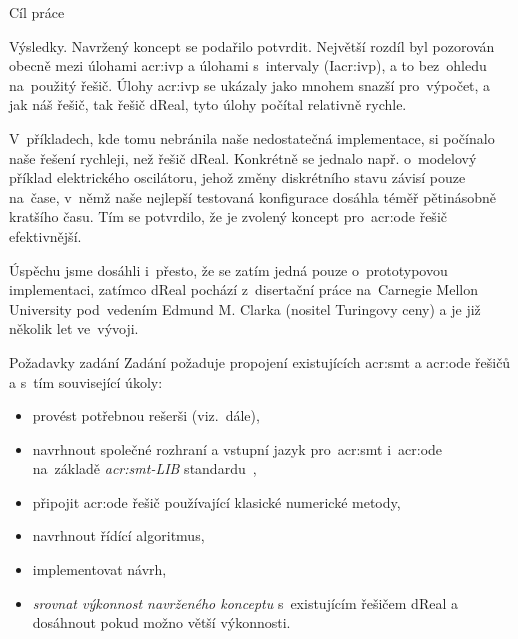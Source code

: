 \documentclass[thesis=M,czech]{FITthesis}[2012/06/26]
\newcommand{\acrlabel}[1]{acr:#1}
\newcommand{\acr}[1]{\acrshort{\acrlabel{#1}}}
\newcommand{\hl}[1]{\textit{#1}}
\newcommand{\name}[1]{\hl{#1}}
\newcommand{\cit}[1]{\cite{#1}}
\begin{document}
\begin{introduction}
\begin{section}{Cíl práce}

\begin{paragraph}{Výsledky.}\label{p:intro:goal:results}
Navržený koncept se podařilo potvrdit.
Největší rozdíl byl pozorován obecně
mezi úlohami \acr{ivp} a úlohami s~intervaly
(I\acr{ivp}), a to bez~ohledu
na~použitý řešič.
Úlohy \acr{ivp} se ukázaly jako mnohem
snazší pro~výpočet,
a jak náš řešič, tak řešič dReal,
tyto úlohy počítal relativně rychle.

V~příkladech, kde tomu nebránila
naše nedostatečná implementace,
si počínalo naše řešení rychleji, než řešič dReal.
Konkrétně se jednalo např. o~modelový příklad
elektrického oscilátoru, jehož změny diskrétního stavu
závisí pouze na~čase,
v~němž naše nejlepší testovaná konfigurace
dosáhla téměř pětinásobně kratšího času.
Tím se potvrdilo,
že je zvolený koncept pro~\acr{ode} řešič efektivnější.

Úspěchu jsme dosáhli i~přesto,
že se zatím jedná pouze o~prototypovou implementaci,
zatímco dReal pochází z~disertační práce
na~Carnegie Mellon University
pod~vedením Edmund M. Clarka (nositel Turingovy ceny)
a je již několik let ve~vývoji.
\end{paragraph} %


\end{section} %


\begin{section}{Požadavky zadání}\label{s:intro:req}
Zadání požaduje propojení existujících \acr{smt} a \acr{ode} řešičů
a s~tím související úkoly:
\begin{itemize}
\item provést potřebnou rešerši (viz.~dále),
\item navrhnout společné rozhraní
   a vstupní jazyk pro~\acr{smt} i~\acr{ode}
   na~základě \name{\acr{smt}-LIB} standardu~\cit{smtlib},
\item připojit \acr{ode} řešič používající klasické numerické metody,
\item navrhnout řídící algoritmus,
\item implementovat návrh,
\item \hl{srovnat výkonnost navrženého konceptu}
   s~existujícím řešičem dReal a dosáhnout pokud možno větší výkonnosti.
\end{itemize}



\end{section}
\end{introduction}
\end{document}
